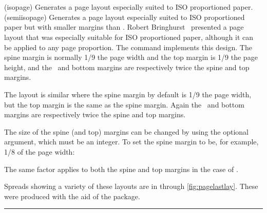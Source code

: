 \begin{syntax}
\cmd{\isopage} \\
\cmd{\semiisopage} \\
\end{syntax}
\glossary(isopage)%
  {}%
  {Generates a page layout especially suited to ISO proportioned paper.}
\glossary(semiisopage)%
  {}%
  {Generates a page layout especially suited to ISO proportioned paper but with
   smaller margins than .}
Robert Bringhurst~\cite{BRINGHURST99} presented a page layout that was
especially suitable for ISO proportioned paper, although it can be applied to
any page proportion. The \cmd{\isopage} command implements this design. The
spine margin is normally 1/9 the page width and the top margin is 1/9 the
page height, and the \foredge\ and bottom margins are respectively twice the
spine and top margins. 

   The \cmd{\semiisopage} layout is similar where the spine margin by default 
is 1/9 the page width, but the top margin is the same as the spine margin.
Again the \foredge\ and bottom margins are respectively twice the
spine and top margins. 

The size of the spine (and top) margins can be changed by using the optional
 argument, which must be an integer. To set the spine margin to
be, for example, 1/8 of the page width:
\begin{lcode}
\semiisopage[8]%
\end{lcode}
The same factor applies to both the spine and top margins in the case
of \cmd{\isopage}.

    Spreads showing a variety of these layouts are in  
through \ref{fig:pagelastlay}. These were produced with the aid of the
 package.

\fancybreak{}

